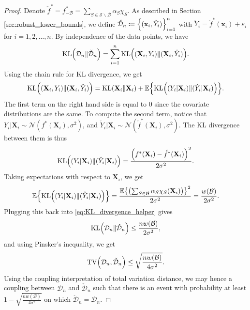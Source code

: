 \documentclass[11pt]{article}
\newcommand{\bx}{\mathbf{x}}
\newcommand{\bX}{\mathbf{X}}
\DeclarePairedDelimiter{\braces}{\lbrace}{\rbrace}
\DeclarePairedDelimiter{\paren}{(}{)}
\newcommand{\E}{\mathbb{E}}
\newcommand{\KL}{\operatorname{KL}}
\newcommand{\nsamples}{n}
\newcommand{\data}[1][n]{\mathcal{D}_{#1}}
\newcommand{\cutset}{\mathcal{B}}
\newcommand{\monomial}{\chi}
\newcommand{\modifieddata}{\check{\mathcal{D}}_\nsamples}
\newcommand{\TV}{\operatorname{TV}}
\newcommand{\fcoefs}{\mathcal{S}}
\begin{document}
\begin{proof}
    Denote $\check f^* = f^*_{-\cutset} = \sum_{S \in \fcoefs\backslash\cutset}\alpha_S\monomial_S$.
    As described in Section \ref{sec:robust_lower_bounds}, we define $\modifieddata \coloneqq \braces*{(\bx_i,\check Y_i)}_{i=1}^\nsamples$ with $\check Y_i = \check f^*(\bx_i) + \varepsilon_i$ for $i=1,2,\ldots,\nsamples$.
    By independence of the data points, we have
    \begin{equation}
    \label{eq:KL_divergence_helper}
        \KL\paren*{\data\|\modifieddata} = \sum_{i=1}^\nsamples \KL\paren*{(\bX_i,Y_i)\|(\bX_i,\check Y_i)}.
    \end{equation}
    Using the chain rule for KL divergence, we get
    \begin{equation}
        \KL\paren*{(\bX_i,Y_i)\|(\bX_i,\check Y_i)} = \KL(\bX_i\|\bX_i) + \E\braces*{\KL\paren*{(Y_i|\bX_i)\|(\check Y_i|\bX_i)}}.
    \end{equation}
    The first term on the right hand side is equal to $0$ since the covariate distributions are the same.
    To compute the second term, notice that $Y_i|\bX_i \sim \mathcal{N}(f^*(\bX_i),\sigma^2)$, and $\check Y_i|\bX_i \sim \mathcal{N}(\check f^*(\bX_i),\sigma^2)$.
    The KL divergence between them is thus
    \begin{equation}
        \KL\paren*{(Y_i|\bX_i)\|(\check Y_i|\bX_i)} = \frac{\paren*{f^*(\bX_i)-\check f^*(\bX_i)}^2}{2\sigma^2}.
    \end{equation}
    Taking expectations with respect to $\bX_i$, we get
    \begin{equation}
        \E\braces*{\KL\paren*{(Y_i|\bX_i)\|(\check Y_i|\bX_i)}} = \frac{\E\braces*{\paren*{\sum_{S \in \cutset} \alpha_S \monomial_S(\bX_i)}}^2}{2\sigma^2} = \frac{w(\cutset)}{2\sigma^2}.
    \end{equation}
    Plugging this back into \eqref{eq:KL_divergence_helper} gives
    \begin{equation}
        \KL\paren*{\data\|\modifieddata} \leq \frac{\nsamples w(\cutset)}{2\sigma^2},
    \end{equation}
    and using Pinsker's inequality, we get
    \begin{equation}
        \TV\paren*{\data,\modifieddata} \leq \sqrt{\frac{\nsamples w(\cutset)}{4\sigma^2}}.
    \end{equation}
    Using the coupling interpretation of total variation distance, we may hence a coupling between $\data$ and $\modifieddata$ such that there is an event with probability at least $1 - \sqrt{\frac{\nsamples w(\cutset)}{4\sigma^2}}$ on which $\modifieddata = \data$.

\end{proof}
\end{document}
